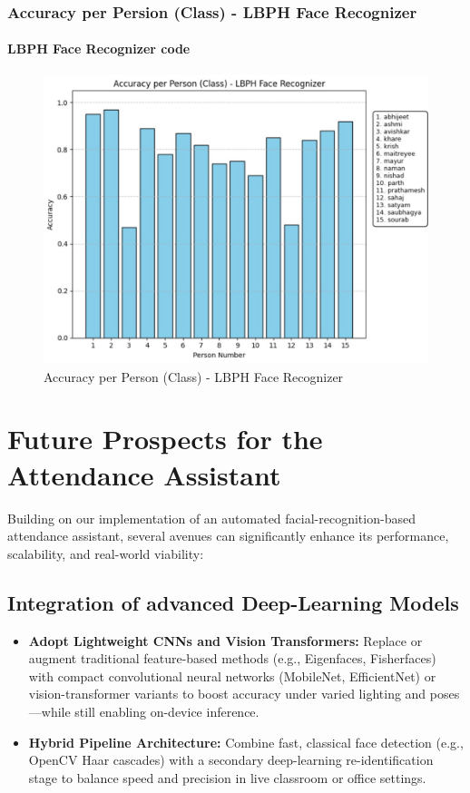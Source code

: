 \documentclass[openany]{report}
\begin{document}
\subsection{Accuracy per Persion (Class) - LBPH Face Recognizer}
\subsubsection{LBPH Face Recognizer code}
\lstset{language=Python, basicstyle=\ttfamily\small, numbers=left}

\begin{figure}[H]
    \centering
    \includegraphics[width=.95\textwidth]{../imgs/accuracy per person.jpg}
    \caption{Accuracy per Person (Class) - LBPH Face Recognizer}
\end{figure}


\chapter{Future Prospects for the Attendance Assistant }
Building on our implementation of an automated facial-recognition-based attendance assistant, several avenues can significantly enhance its performance, scalability, and real-world viability:
\section{Integration of advanced Deep-Learning Models}
\begin{itemize}
    \item \textbf{Adopt Lightweight CNNs and Vision Transformers:} Replace or augment traditional feature-based methods (e.g., Eigenfaces, Fisherfaces) with compact convolutional neural networks (MobileNet, EfficientNet) or vision-transformer variants to boost accuracy under varied lighting and poses—while still enabling on-device inference.
    \item \textbf{Hybrid Pipeline Architecture:} Combine fast, classical face detection (e.g., OpenCV Haar cascades) with a secondary deep-learning re-identification stage to balance speed and precision in live classroom or office settings.
\end{itemize}
\end{document}
